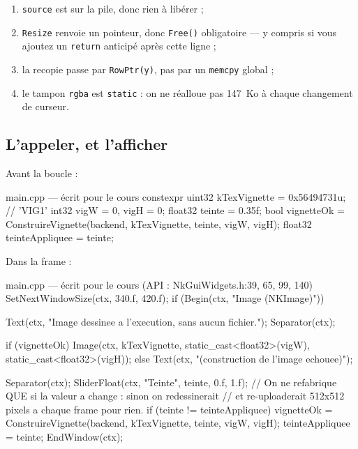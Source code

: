 \begin{enumerate}
  \item \texttt{source} est sur la pile, donc rien à libérer ;
  \item \texttt{Resize} renvoie un pointeur, donc \texttt{Free()} obligatoire —
        y compris si vous ajoutez un \texttt{return} anticipé après cette ligne ;
  \item la recopie passe par \texttt{RowPtr(y)}, pas par un \texttt{memcpy}
        global ;
  \item le tampon \texttt{rgba} est \texttt{static} : on ne réalloue pas 147~Ko à
        chaque changement de curseur.
\end{enumerate}

\subsection{L'appeler, et l'afficher}

Avant la boucle :

\begin{nkcode}{main.cpp — écrit pour le cours}
    constexpr uint32 kTexVignette = 0x56494731u;   // 'VIG1'
    int32 vigW = 0, vigH = 0;
    float32 teinte = 0.35f;
    bool vignetteOk = ConstruireVignette(backend, kTexVignette, teinte, vigW, vigH);
    float32 teinteAppliquee = teinte;
\end{nkcode}

Dans la frame :

\begin{nkcode}{main.cpp — écrit pour le cours (API : NkGuiWidgets.h:39, 65, 99, 140)}
        SetNextWindowSize(ctx, 340.f, 420.f);
        if (Begin(ctx, "Image (NKImage)")) {
            Text(ctx, "Image dessinee a l'execution, sans aucun fichier.");
            Separator(ctx);

            if (vignetteOk)
                Image(ctx, kTexVignette, static_cast<float32>(vigW), static_cast<float32>(vigH));
            else
                Text(ctx, "(construction de l'image echouee)");

            Separator(ctx);
            SliderFloat(ctx, "Teinte", teinte, 0.f, 1.f);
            // On ne refabrique QUE si la valeur a change : sinon on redessinerait
            // et re-uploaderait 512x512 pixels a chaque frame pour rien.
            if (teinte != teinteAppliquee) {
                vignetteOk = ConstruireVignette(backend, kTexVignette, teinte, vigW, vigH);
                teinteAppliquee = teinte;
            }
            EndWindow(ctx);
        }
\end{nkcode}

